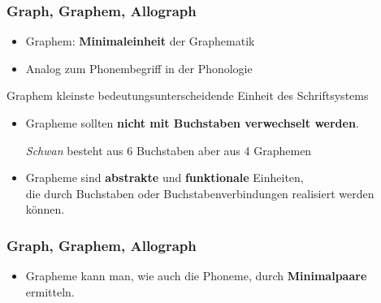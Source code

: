 \begin{frame}
\frametitle{Graph, Graphem, Allograph}

\begin{itemize}
	\item Graphem: \textbf{Minimaleinheit} der Graphematik

	\item Analog zum Phonembegriff in der Phonologie
\end{itemize}

\begin{block}{Graphem}
kleinste bedeutungsunterscheidende Einheit des Schriftsystems
\end{block}

\pause 

\begin{itemize}
	\item Grapheme sollten \textbf{nicht mit Buchstaben verwechselt werden}.

	\ea \emph{Schwan} besteht aus 6 Buchstaben aber aus 4 Graphemen
	\z 
	 	
	\item Grapheme sind \textbf{abstrakte} und \textbf{funktionale} Einheiten,\\
	die durch Buchstaben oder Buchstabenverbindungen realisiert werden können.
\end{itemize}

\end{frame}


\begin{frame}
\frametitle{Graph, Graphem, Allograph}

\begin{itemize}
	\item Grapheme kann man, wie auch die Phoneme, durch \textbf{Minimalpaare} ermitteln.
	
	\pause
	 
\settowidth{} 

	\ea {} \vs {} 
	
	\ex {} \vs {} 
	
	\ex {} \vs {} 
	
	\ex {} \vs {} 
	\z
\end{itemize}

\end{frame}


